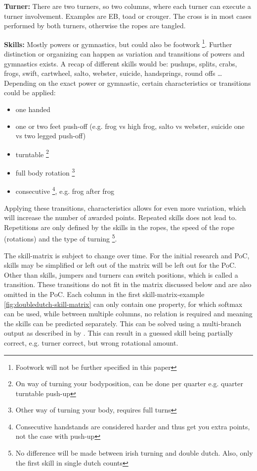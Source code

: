 \textbf{Turner:} There are two turners, so two columns, where each turner can execute a turner involvement. Examples are EB, toad or crouger. The cross is in most cases performed by both turners, otherwise the ropes are tangled.

\textbf{Skills:} Mostly powers or gymnastics, but could also be footwork \footnote{Footwork will not be further specified in this paper}. Further distinction or organizing can happen as variation and transitions of powers and gymnastics exists. A recap of different skills would be: pushups, splits, crabs, frogs, swift, cartwheel, salto, webster, suicide, handsprings, round offs \dots %
Depending on the exact power or gymnastic, certain characteristics or transitions could be applied:

\begin{itemize}
    \item one handed
    \item one or two feet push-off (e.g. frog vs high frog, salto vs webster, suicide one vs two legged push-off)
    \item turntable \footnote{On way of turning your bodyposition, can be done per quarter e.g. quarter turntable push-up}
    \item full body rotation \footnote{Other way of turning your body, requires full turns}
    \item consecutive \footnote{Consecutive handstands are considered harder and thus get you extra points, not the case with push-up}, e.g. frog after frog
\end{itemize}

Applying these transitions, characteristics allows for even more variation, which will increase the number of awarded points. Repeated skills does not lead to. Repetitions are only defined by the skills in the ropes, the speed of the rope (rotations) and the type of turning \footnote{No difference will be made between irish turning and double dutch. Also, only the first skill in single dutch counts}.

\medskip

The skill-matrix is subject to change over time. For the initial research and PoC, skills may be simplified or left out of the matrix will be left out for the PoC. Other than skills, jumpers and turners can switch positions, which is called a transition. These transitions do not fit in the matrix discussed below and are also omitted in the PoC.
Each column in the first skill-matrix-example \ref{fig:doubledutch-skill-matrix} can only contain one property, for which softmax can be used, while between multiple columns, no relation is required and meaning the skills can be predicted separately. This can be solved using a multi-branch output as described in by \textcite{Coulibaly_2022}. This can result in a guessed skill being partially correct, e.g. turner correct, but wrong rotational amount.




